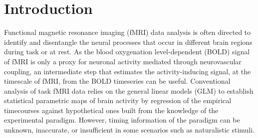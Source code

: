
\section{Introduction}








Functional magnetic resonance imaging (fMRI) data analysis is often directed to identify and disentangle the neural processes that occur in different brain regions during task or at rest. As the blood oxygenation level-dependent (BOLD) signal of fMRI is only a proxy for neuronal activity mediated through neurovascular coupling, an intermediate step that estimates the activity-inducing signal, at the timescale of fMRI, from the BOLD timeseries can be useful. Conventional analysis of task fMRI data relies on the general linear models (GLM) to establish statistical parametric maps of brain activity by regression of the empirical timecourses against hypothetical ones built from the knowledge of the experimental paradigm. However, timing information of the paradigm can be unknown, inaccurate, or insufficient in some scenarios such as naturalistic stimuli. 

